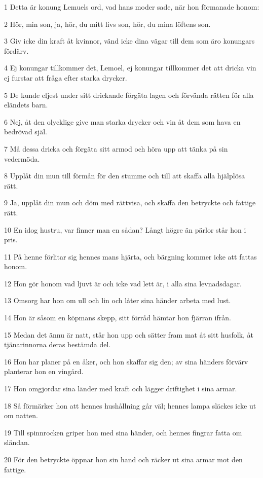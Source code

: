 \par 1 Detta är konung Lemuels ord, vad hans moder sade, när hon förmanade honom:
\par 2 Hör, min son, ja, hör, du mitt livs son, hör, du mina löftens son.
\par 3 Giv icke din kraft åt kvinnor, vänd icke dina vägar till dem som äro konungars fördärv.
\par 4 Ej konungar tillkommer det, Lemoel, ej konungar tillkommer det att dricka vin ej furstar att fråga efter starka drycker.
\par 5 De kunde eljest under sitt drickande förgäta lagen och förvända rätten för alla eländets barn.
\par 6 Nej, åt den olycklige give man starka drycker och vin åt dem som hava en bedrövad själ.
\par 7 Må dessa dricka och förgäta sitt armod och höra upp att tänka på sin vedermöda.
\par 8 Upplåt din mun till förmån för den stumme och till att skaffa alla hjälplösa rätt.
\par 9 Ja, upplåt din mun och döm med rättvisa, och skaffa den betryckte och fattige rätt.
\par 10 En idog hustru, var finner man en sådan? Långt högre än pärlor står hon i pris.
\par 11 På henne förlitar sig hennes mans hjärta, och bärgning kommer icke att fattas honom.
\par 12 Hon gör honom vad ljuvt är och icke vad lett är, i alla sina levnadsdagar.
\par 13 Omsorg har hon om ull och lin och låter sina händer arbeta med lust.
\par 14 Hon är såsom en köpmans skepp, sitt förråd hämtar hon fjärran ifrån.
\par 15 Medan det ännu är natt, står hon upp och sätter fram mat åt sitt husfolk, åt tjänarinnorna deras bestämda del.
\par 16 Hon har planer på en åker, och hon skaffar sig den; av sina händers förvärv planterar hon en vingård.
\par 17 Hon omgjordar sina länder med kraft och lägger driftighet i sina armar.
\par 18 Så förmärker hon att hennes hushållning går väl; hennes lampa släckes icke ut om natten.
\par 19 Till spinnrocken griper hon med sina händer, och hennes fingrar fatta om sländan.
\par 20 För den betryckte öppnar hon sin hand och räcker ut sina armar mot den fattige.
